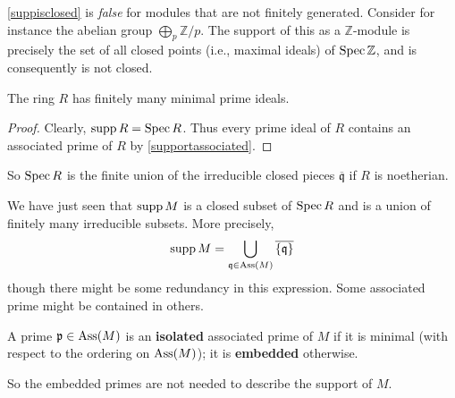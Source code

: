\begin{example} 
\cref{suppisclosed} is \emph{false} for modules that are not finitely
generated. Consider for instance the abelian group $\bigoplus_p \mathbb{Z}/p$.
The support of this as a $\mathbb{Z}$-module is precisely the set of all
closed points (i.e., maximal ideals) of $\operatorname{Spec} \mathbb{Z}$, and is
consequently is not closed. 
\end{example} 

\begin{corollary} 
The ring $R$ has finitely many minimal prime ideals. 
\end{corollary} 
\begin{proof} 
Clearly, $\operatorname{supp} R = \operatorname{Spec} R$. Thus every prime ideal of $R$
contains an associated prime of $R$ by \cref{supportassociated}.
\end{proof} 

So $\operatorname{Spec} R$ is the finite union of the  irreducible closed  pieces
$\overline{\mathfrak{q}}$ if $R$ is noetherian.

We have just seen that $\operatorname{supp} M$ is a closed subset of $\operatorname{Spec} R$ and is a union
of finitely many irreducible subsets.  More precisely, 
\[ \operatorname{supp} M = \bigcup_{\mathfrak{q} \in \operatorname{Ass}(M)}
\overline{\left\{\mathfrak{q}\right\}}  \]
though there might be some redundancy in this expression. Some associated prime might be contained
in others.  

\begin{definition} 
A prime $\mathfrak{p} \in \operatorname{Ass}(M)$ is an \textbf{isolated} associated prime of
$M$ if it is minimal (with respect to the ordering on $\operatorname{Ass}(M)$); it is
\textbf{embedded} otherwise. 
\end{definition} 

So the embedded primes are not needed to describe the support of $M$. 


